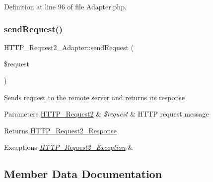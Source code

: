 Definition at line 96 of file Adapter.\+php.

\hypertarget{classHTTP__Request2__Adapter_a4a9516fe4151ea9492952b3706f21e08}{}\label{classHTTP__Request2__Adapter_a4a9516fe4151ea9492952b3706f21e08} 
\subsubsection{\texorpdfstring{send\+Request()}{sendRequest()}}
{\footnotesize\ttfamily H\+T\+T\+P\+\_\+\+Request2\+\_\+\+Adapter\+::send\+Request (\begin{DoxyParamCaption}\item[{\hyperlink{classHTTP__Request2}{H\+T\+T\+P\+\_\+\+Request2}}]{\$request }\end{DoxyParamCaption})\hspace{0.3cm}{\ttfamily [abstract]}}

Sends request to the remote server and returns its response


\begin{DoxyParams}[1]{Parameters}
\hyperlink{classHTTP__Request2}{H\+T\+T\+P\+\_\+\+Request2} & {\em \$request} & H\+T\+TP request message\\
\hline
\end{DoxyParams}
\begin{DoxyReturn}{Returns}
\hyperlink{classHTTP__Request2__Response}{H\+T\+T\+P\+\_\+\+Request2\+\_\+\+Response} 
\end{DoxyReturn}

\begin{DoxyExceptions}{Exceptions}
{\em \hyperlink{classHTTP__Request2__Exception}{H\+T\+T\+P\+\_\+\+Request2\+\_\+\+Exception}} & \\
\hline
\end{DoxyExceptions}


\subsection{Member Data Documentation}
\hypertarget{classHTTP__Request2__Adapter_aff1fdc6f36307d7e6febd29573741d33}{}\label{classHTTP__Request2__Adapter_aff1fdc6f36307d7e6febd29573741d33} 
